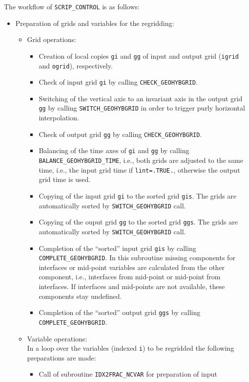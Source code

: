\documentclass[11pt,twoside]{article}
\begin{document}
The workflow of \verb|SCRIP_CONTROL| is as follows:
\begin{itemize} %
\item Preparation of grids and variables for the regridding:
\begin{itemize} %
\item Grid operations:
\begin{itemize}%
\item Creation of local copies \verb|gi| and \verb|gg| of input and
output grid (\verb|igrid| and \verb|ogrid|), respectively.
\item Check of input grid \verb|gi| by calling \verb|CHECK_GEOHYBGRID|.
\item Switching of the vertical axis to an invariant axis in the output
grid \verb|gg| by calling \verb|SWITCH_GEOHYBGRID| in order to trigger
purly horizontal interpolation.
\item Check of output grid \verb|gg| by calling \verb|CHECK_GEOHYBGRID|.
\item Balancing of the time axes of \verb|gi| and \verb|gg| by
calling \verb|BALANCE_GEOHYBGRID_TIME|, i.e., both grids are adjusted
to the same time, i.e., the input grid time if \verb|lint=.TRUE.|,
otherwise  the output grid time is used.
\item Copying of the input grid \verb|gi| to the sorted grid \verb|gis|. The
grids are automatically sorted by \verb|SWITCH_GEOHYBGRID| call.
\item Copying of the ouput grid \verb|gg| to the sorted grid \verb|ggs|. The
grids are automatically sorted by \verb|SWITCH_GEOHYBGRID| call.
\item Completion of the ``sorted'' input grid \verb|gis| 
by calling \verb|COMPLETE_GEOHYBGRID|. In this
subroutine missing components for interfaces or mid-point variables
are calculated from the other component, i.e., interfaces from
mid-point or mid-point from interfaces. If interfaces and mid-points
are not available, these components stay undefined.
\item Completion of the ``sorted'' output grid \verb|ggs|
by calling \verb|COMPLETE_GEOHYBGRID|. 
\end{itemize}%
\item Variable operations:\\
In a loop over the variables (indexed \verb|i|) to be regridded the following
 preparations are made:
 \begin{itemize}%
\item Call of subroutine \verb|IDX2FRAC_NCVAR| for preparation of input

\end{itemize}
\end{itemize}
\end{itemize}
\end{document}
